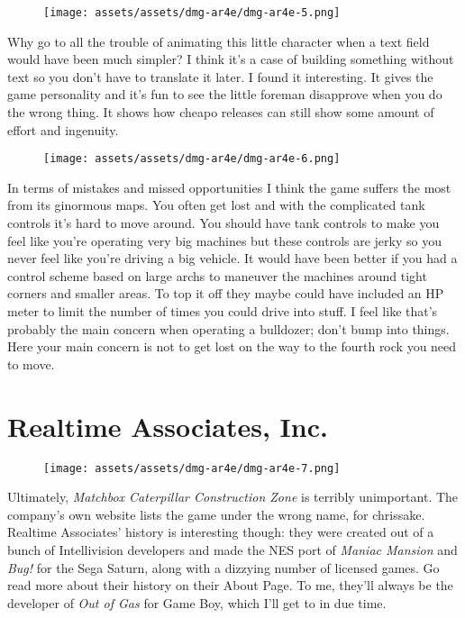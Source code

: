 \documentclass{book}
\begin{document}
\begin{figure}[hbt]
\vskip 10pt
\centering \texttt{[image: assets/assets/dmg-ar4e/dmg-ar4e-5.png]}
\vskip 6pt
\end{figure}
Why go to all the trouble of animating this little character when a text field would have been much simpler? I think it’s a case of building something without text so you don’t have to translate it later. I found it interesting. It gives the game personality and it’s fun to see the little foreman disapprove when you do the wrong thing. It shows how cheapo releases can still show some amount of effort and ingenuity.

\begin{figure}[hbt]
\vskip 10pt
\centering \texttt{[image: assets/assets/dmg-ar4e/dmg-ar4e-6.png]}
\vskip 6pt
\end{figure}
In terms of mistakes and missed opportunities I think the game suffers the most from its ginormous maps. You often get lost and with the complicated tank controls it’s hard to move around. You should have tank controls to make you feel like you’re operating very big machines but these controls are jerky so you never feel like you’re driving a big vehicle. It would have been better if you had a control scheme based on large archs to maneuver the machines around tight corners and smaller areas. To top it off they maybe could have included an HP meter to limit the number of times you could drive into stuff. I feel like that’s probably the main concern when operating a bulldozer; don’t bump into things. Here your main concern is not to get lost on the way to the fourth rock you need to move.

\FloatBarrier\needspace{10mm}\section*{Realtime Associates, Inc.}\nopagebreak[4]

\begin{figure}[hbt]
\vskip 10pt
\centering \texttt{[image: assets/assets/dmg-ar4e/dmg-ar4e-7.png]}
\vskip 6pt
\end{figure}
Ultimately, \emph{Matchbox Caterpillar Construction Zone} is terribly unimportant. The company’s own website lists the game under the wrong name, for chrissake. Realtime Associates’ history is interesting though: they were created out of a bunch of Intellivision developers and made the NES port of \emph{Maniac Mansion} and \emph{Bug!} for the Sega Saturn, along with a dizzying number of licensed games. Go read more about their history on their About Page. To me, they’ll always be the developer of \emph{Out of Gas} for Game Boy, which I’ll get to in due time.
\end{document}
